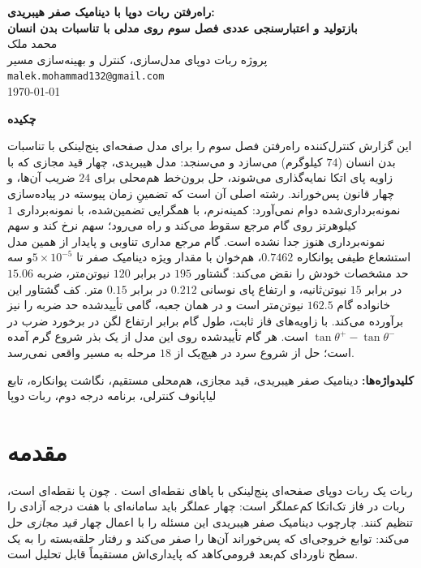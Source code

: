 \documentclass[10pt,twocolumn]{article}
\makeatletter
\newcommand{\en}[1]{\lr{#1}}
\newcommand{\md}{\lr{\textemdash}}
\newcommand{\nd}{\lr{\textendash}}
\newcommand{\reporttitle}{راه‌رفتن ربات دوپا با دینامیک صفر هیبریدی:\\[0.2em]
بازتولید و اعتبارسنجی عددی فصل سوم روی مدلی با تناسبات بدن انسان}
\newcommand{\reportauthor}{محمد ملک}
\newcommand{\reportaffil}{پروژه ربات دوپای \en{RABBIT} \nd{} مدل‌سازی، کنترل و بهینه‌سازی مسیر}
\newcommand{\reportemail}{malek.mohammad132@gmail.com}
\makeatother
\begin{document}
\onecolumn
\begin{center}
    {\bfseries\Large \reporttitle}\\[0.8em]
    \reportauthor \\
    \small \reportaffil \\
    \small \texttt{\reportemail} \\[0.3em]
    \today
\end{center}
\vspace{1em}

\begin{center}
    {\bfseries\large چکیده}
\end{center}
\noindent
این گزارش کنترل‌کننده راه‌رفتن فصل سوم را برای مدل صفحه‌ای پنج‌لینکی \en{RABBIT} با تناسبات
بدن انسان ($74$ کیلوگرم) می‌سازد و می‌سنجد: مدل هیبریدی، چهار قید مجازی که با زاویه پای اتکا
نمایه‌گذاری می‌شوند، حل برون‌خط هم‌محلی برای $24$ ضریب آن‌ها، و چهار قانون پس‌خوراند. رشته
اصلی آن است که تضمینِ زمان پیوسته در پیاده‌سازی نمونه‌برداری‌شده دوام نمی‌آورد: \en{CLF-QP}
کمینه‌نرم، با همگرایی تضمین‌شده، با نمونه‌برداری $1$ کیلوهرتز روی گام مرجع سقوط می‌کند و
\en{PD} راه می‌رود؛ سهم نرخ کند \en{CLF} و سهم نمونه‌برداری هنوز جدا نشده است. گام مرجع
مداری تناوبی و پایدار از همین مدل است\md{}شعاع طیفی پوانکاره $0.7462$، هم‌خوان با مقدار ویژه
دینامیک صفر تا $5\times10^{-5}$\md{}و سه حد مشخصات خودش را نقض می‌کند: گشتاور $195$ در
برابر $120$ نیوتن‌متر، ضربه $15.06$ در برابر $15$ نیوتن‌ثانیه، و ارتفاع پای نوسانی $0.212$ در
برابر $0.15$ متر. کف گشتاور این خانواده گام $162.5$ نیوتن‌متر است و در همان جعبه، گامی
تأییدشده حد ضربه را نیز برآورده می‌کند. با زاویه‌های فاز ثابت، طول گام برابر ارتفاع لگن در
برخورد ضرب در $\tan\theta^{+}-\tan\theta^{-}$ است. هر گام تأییدشده روی این مدل از یک بذر
شروع گرم آمده است؛ حل از شروع سرد در هیچ‌یک از $18$ مرحله به مسیر واقعی نمی‌رسد.

\vspace{0.6em}
\noindent\textbf{کلیدواژه‌ها:} دینامیک صفر هیبریدی، قید مجازی، هم‌محلی مستقیم، نگاشت پوانکاره،
تابع لیاپانوف کنترلی، برنامه درجه دوم، ربات دوپا
\vspace{1em}
\twocolumn

\section{مقدمه}
ربات \en{RABBIT} یک ربات دوپای صفحه‌ای پنج‌لینکی با پاهای نقطه‌ای است
\cite{chevallereau2003rabbit}. چون پا نقطه‌ای است، ربات در فاز تک‌اتکا کم‌عملگر است: چهار
عملگر باید سامانه‌ای با هفت درجه آزادی را تنظیم کنند. چارچوب دینامیک صفر هیبریدی
\cite{westervelt2007feedback} این مسئله را با اعمال چهار \emph{قید مجازی} حل می‌کند: توابع
خروجی‌ای که پس‌خوراند آن‌ها را صفر می‌کند و رفتار حلقه‌بسته را به یک سطح ناوردای کم‌بعد
فرومی‌کاهد که پایداری‌اش مستقیماً قابل تحلیل است.
\end{document}
